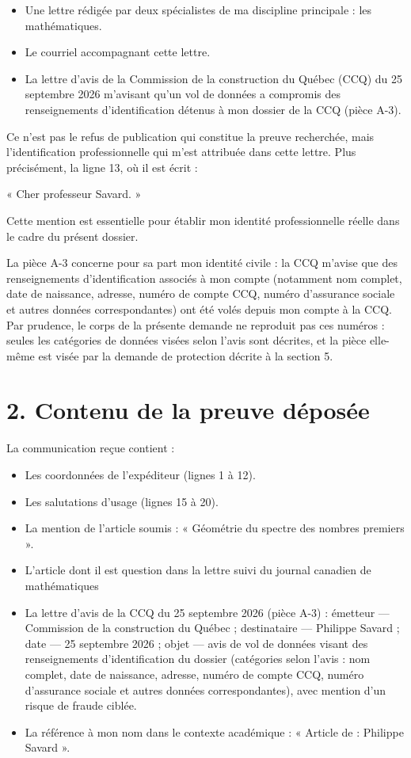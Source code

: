 \documentclass[12pt,a4paper]{article}
\begin{document}
\begin{itemize}
  \item Une lettre rédigée par deux spécialistes de ma discipline principale : les mathématiques.
  \item Le courriel accompagnant cette lettre.

  \item La lettre d’avis de la Commission de la construction du Québec (CCQ) du 25 septembre 2026 m’avisant qu’un vol de données a compromis des renseignements d’identification détenus à mon dossier de la CCQ (pièce A-3).
\end{itemize}

Ce n’est pas le refus de publication qui constitue la preuve recherchée, mais l’identification professionnelle qui m’est attribuée dans cette lettre. Plus précisément, la ligne 13, où il est écrit :

« Cher professeur Savard. »

Cette mention est essentielle pour établir mon identité professionnelle réelle dans le cadre du présent dossier.



La pièce A-3 concerne pour sa part mon identité civile : la CCQ m’avise que des renseignements d’identification associés à mon compte (notamment nom complet, date de naissance, adresse, numéro de compte CCQ, numéro d’assurance sociale et autres données correspondantes) ont été volés depuis mon compte à la CCQ. Par prudence, le corps de la présente demande ne reproduit pas ces numéros : seules les catégories de données visées selon l’avis sont décrites, et la pièce elle-même est visée par la demande de protection décrite à la section 5.

\section*{2. Contenu de la preuve déposée}
La communication reçue contient :

\begin{itemize}
  \item Les coordonnées de l’expéditeur (lignes 1 à 12).
  \item Les salutations d’usage (lignes 15 à 20).
  \item La mention de l’article soumis : « Géométrie du spectre des nombres premiers ».
  \item L’article dont il est question dans la lettre suivi du journal canadien de mathématiques
  \item La lettre d’avis de la CCQ du 25 septembre 2026 (pièce A-3) : émetteur --- Commission de la construction du Québec ; destinataire --- Philippe Savard ; date --- 25 septembre 2026 ; objet --- avis de vol de données visant des renseignements d’identification du dossier (catégories selon l’avis : nom complet, date de naissance, adresse, numéro de compte CCQ, numéro d’assurance sociale et autres données correspondantes), avec mention d’un risque de fraude ciblée.
  \item La référence à mon nom dans le contexte académique : « Article de : Philippe Savard ».
\end{itemize}
\end{document}
